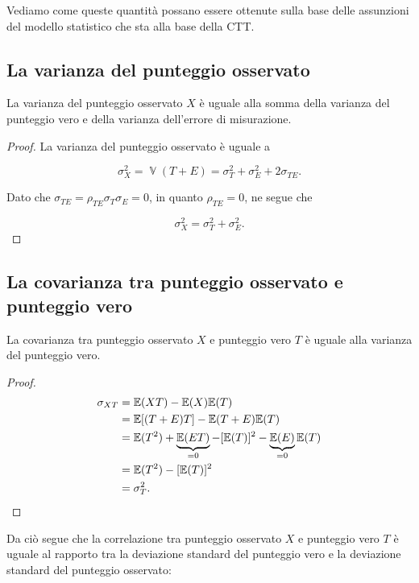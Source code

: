\documentclass[
  11pt,
]{krantz}
\DeclareMathOperator{\V}{\mathbb{V}} %
\newcommand{\E}{\mathbb{E}} %
\theoremstyle{definition}
\theoremstyle{definition}
\theoremstyle{definition}
\theoremstyle{definition}
\theoremstyle{remark}
\begin{document}
Vediamo come queste quantità possano essere ottenute sulla base delle assunzioni del modello statistico che sta alla base della CTT.

\hypertarget{la-varianza-del-punteggio-osservato}{%
\subsection{La varianza del punteggio osservato}\label{la-varianza-del-punteggio-osservato}}

La varianza del punteggio osservato \(X\) è uguale alla somma della varianza del punteggio vero e della varianza dell'errore di misurazione.

\begin{proof}
La varianza del punteggio osservato è uguale a

\[
\sigma^2_X =  \V(T+E) =  \sigma_T^2 + \sigma_E^2 + 2 \sigma_{TE}.
\label{eq:3-2-4}
\]

Dato che \(\sigma_{TE}=\rho_{TE}\sigma_T \sigma_E=0\), in quanto \(\rho_{TE}=0\), ne segue che

\[
\sigma^2_X =   \sigma_T^2 + \sigma_E^2.
\label{eq:var-sum}
\]
\end{proof}

\hypertarget{la-covarianza-tra-punteggio-osservato-e-punteggio-vero}{%
\subsection{La covarianza tra punteggio osservato e punteggio vero}\label{la-covarianza-tra-punteggio-osservato-e-punteggio-vero}}

La covarianza tra punteggio osservato \(X\) e punteggio vero \(T\) è uguale alla varianza del punteggio vero.

\begin{proof}
\begin{equation}
\begin{aligned}
\sigma_{X T} &= \E(XT) - \E(X)\E(T)\notag\\
&=  \E[(T+E)T] - \E(T+E)\E(T)\notag\\
&=  \E(T^2) + \underbrace{\E(ET)}_{=0} - [\E(T)]^2 -  \underbrace{\E(E)}_{=0} \E(T)\notag\\
&=\E(T^2) - [\E(T)]^2\notag \\
&= \sigma_T^2.
\end{aligned}
\end{equation}
\end{proof}

Da ciò segue che la correlazione tra punteggio osservato \(X\) e punteggio vero \(T\) è uguale al rapporto tra la deviazione standard del punteggio vero e la deviazione standard del punteggio osservato:
\end{document}
